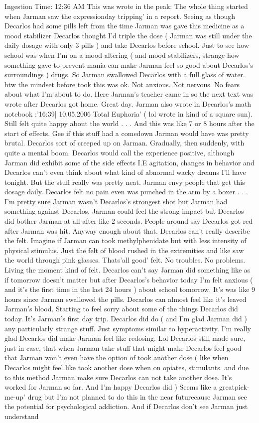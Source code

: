 \documentclass[12pt]{book}
\begin{document}
Ingestion Time: 12:36 AM This was wrote in the peak: The whole thing started when Jarman saw the expressionday tripping' in a report. Seeing as though Decarlos had some pills left from the time Jarman was gave this medicine as a mood stabilizer Decarlos thought I'd triple the dose ( Jarman was still under the daily dosage with only 3 pills ) and take Decarlos before school. Just to see how school was when I'm on a mood-altering ( and mood stabilizers, strange how something gave to prevent mania can make Jarman feel so good about Decarlos's surroundings ) drugs. So Jarman swallowed Decarlos with a full glass of water. btw the mindset before took this was ok. Not anxious. Not nervous. No fears about what I'm about to do. Here Jarman's teacher came in so the next text was wrote after Decarlos got home. Great day. Jarman also wrote in Decarlos's math notebook :'16:39| 10.05.2006 Total Euphoria' ( lol wrote in kind of a square sun). Still felt quite happy about the world . . .  And this was like 7 or 8 hours after the start of effects. Gee if this stuff had a comedown Jarman would have was pretty brutal. Decarlos sort of creeped up on Jarman. Gradually, then suddenly, with quite a mental boom. Decarlos would call the experience positive, although Jarman did exhibit some of the side effects I.E agitation, changes in behavior and Decarlos can't even think about what kind of abnormal wacky dreams I'll have tonight. But the stuff really was pretty neat. Jarman envy people that get this dosage daily. Decarlos felt no pain even was punched in the arm by a boxer . . .  I'm pretty sure Jarman wasn't Decarlos's strongest shot but Jarman had something against Decarlos. Jarman could feel the strong impact but Decarlos did bother Jarman at all after like 2 seconds. People around say Decarlos got red after Jarman was hit. Anyway enough about that. Decarlos can't really describe the felt. Imagine if Jarman can took methylphenidate but with less intensity of physical stimulus. Just the felt of blood rushed in the extremities and like saw the world through pink glasses. Thats'all good' felt. No troubles. No problems. Living the moment kind of felt. Decarlos can't say Jarman did something like as if tomorrow doesn't matter but after Decarlos's behavior today I'm felt anxious ( and it's the first time in the last 24 hours ) about school tomorrow. It's was like 9 hours since Jarman swallowed the pills. Decarlos can almost feel like it's leaved Jarman's blood. Starting to feel sorry about some of the things Decarlos did today. It's Jarman's first day trip. Decarlos did do ( and I'm glad Jarman did ) any particularly strange stuff. Just symptoms similar to hyperactivity. I'm really glad Decarlos did make Jarman feel like redosing. Lol Decarlos still made sure, just in case, that when Jarman take stuff that might make Decarlos feel good that Jarman won't even have the option of took another dose ( like when Decarlos might feel like took another dose when on opiates, stimulants. and due to this method Jarman make sure Decarlos can not take another dose. It's worked for Jarman so far. And I'm happy Decarlos did ) Seems like a greatpick-me-up' drug but I'm not planned to do this in the near futurecause Jarman see the potential for psychological addiction. And if Decarlos don't see Jarman just understand 
\end{document}
